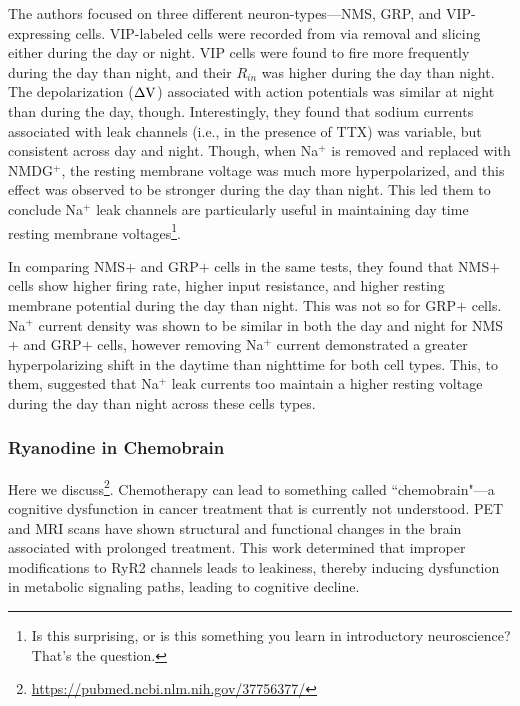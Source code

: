 The authors focused on three different neuron-types---NMS, GRP, and VIP-expressing cells. VIP-labeled cells were recorded from via removal and slicing either during the day or night. VIP cells were found to fire more frequently during the day than night, and their $R_{in}$ was higher during the day than night. The depolarization ($\Delta {\rm V}$) associated with action potentials was similar at night than during the day, though. Interestingly, they found that sodium currents associated with leak channels (i.e., in the presence of TTX) was variable, but consistent across day and night. Though, when Na$^+$ is removed and replaced with NMDG$^+$, the resting membrane voltage was much more hyperpolarized, and this effect was observed to be stronger during the day than night. This led them to conclude Na$^+$ leak channels are particularly useful in maintaining day time resting membrane voltages\footnote{Is this surprising, or is this something you learn in introductory neuroscience? That's the question.}.\newline

In comparing NMS$+$ and GRP$+$ cells in the same tests, they found that NMS$+$ cells show higher firing rate, higher input resistance, and higher resting membrane potential during the day than night. This was not so for GRP$+$ cells. Na$^+$ current density was shown to be similar in both the day and night for NMS$+$ and GRP$+$ cells, however removing Na$^+$ current demonstrated a greater hyperpolarizing shift in the daytime than nighttime for both cell types. This, to them, suggested that Na$^+$ leak currents too maintain a higher resting voltage during the day than night across these cells types. 


\subsubsection{Ryanodine in Chemobrain}

Here we discuss\footnote{\url{https://pubmed.ncbi.nlm.nih.gov/37756377/}}. Chemotherapy can lead to something called ``chemobrain"---a cognitive dysfunction in cancer treatment that is currently not understood. PET and MRI scans have shown structural and functional changes in the brain associated with prolonged treatment. This work determined that improper modifications to RyR2 channels leads to leakiness, thereby inducing dysfunction in metabolic signaling paths, leading to cognitive decline.\newline

